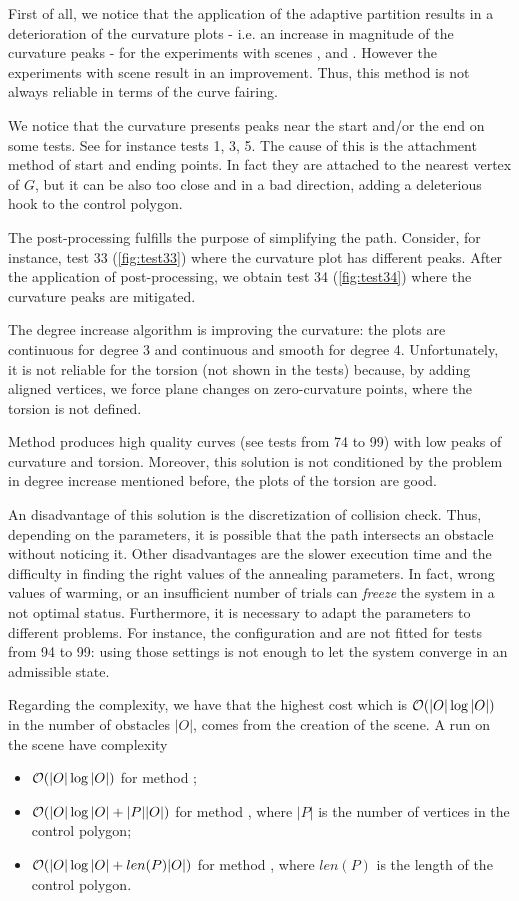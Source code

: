 \documentclass[dissertation.tex]{subfiles}
\begin{document}
First of all, we notice that the application of the adaptive partition
results in a deterioration of the curvature plots - i.e. an increase
in magnitude
of the curvature peaks - for the experiments with scenes \sceneA,
\sceneAb and \sceneB. However the experiments with scene \sceneC result in an
improvement. Thus, this method is not always reliable in terms
of the curve fairing.

We notice that the curvature presents peaks near the start and/or the
end on some tests. See for instance tests 1, 3, 5. The cause of this
is the attachment method of start and ending points. In fact they are
attached to the nearest vertex of $G$, but it can be also too close
and in a bad direction, adding a deleterious hook to the control polygon.

The post-processing fulfills the
purpose of simplifying the path. Consider, for instance, test 33
(\cref{fig:test33}) where the curvature plot has different
peaks. After the application of post-processing, we obtain test 34
(\cref{fig:test34}) where the curvature peaks are mitigated.

The degree increase algorithm is improving the
curvature: the plots are continuous for degree 3 and continuous and
smooth for degree 4. Unfortunately, it is not reliable for the torsion
(not shown in the tests) because, by adding aligned vertices, we force
plane changes on zero-curvature points, where the torsion is not
defined.

Method \metC produces high quality curves (see tests from 74 to 99)
with low peaks of curvature and torsion. Moreover, this solution is
not conditioned by the problem in degree increase mentioned before,
the plots of the torsion are good.

An disadvantage of this
solution is the discretization of collision check. Thus,
depending on the parameters, it is possible that the path intersects
an obstacle without noticing it.
Other disadvantages are the slower
execution time and the difficulty in finding the right values of the
annealing parameters. In fact, wrong values of warming, or an
insufficient number of
trials can \emph{freeze} the system in a not optimal
status. Furthermore, it is necessary to adapt the parameters to
different problems. For instance, the configuration \annB and \annC are
not fitted for tests from 94 to 99: using those settings is not enough
to let the system converge in an admissible state.

Regarding the complexity, we have that the highest cost which is
$\mathcal{O}(|O|\log|O|)$ in the number of obstacles $|O|$, comes from the
creation of the scene. A run on the scene have complexity
\begin{itemize}
\item $\mathcal{O}(|O|\log|O|)$ for method \metA;
\item $\mathcal{O}(|O|\log|O|+|P||O|)$ for method \metB, where $|P|$ is the
  number of vertices in the control polygon;
\item $\mathcal{O}(|O|\log|O|+len(P)|O|)$ for method \metC, where $len(P)$
  is the length of the control polygon.
\end{itemize}
\end{document}

